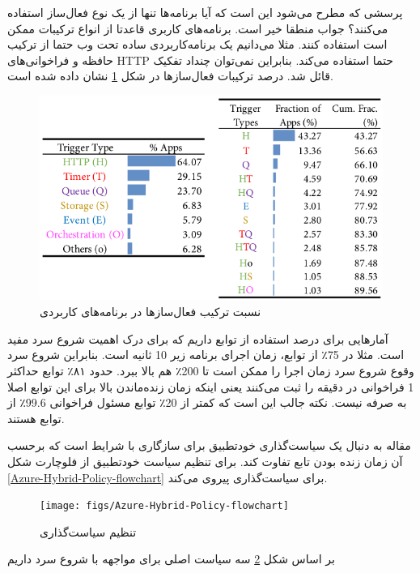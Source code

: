 پرسشی که مطرح می‌شود این است که آیا برنامه‌ها تنها از یک نوع فعال‌ساز استفاده می‌کنند؟ جواب منطقا خیر است. برنامه‌های کاربری قاعدتا از انواع ترکیبات ممکن است استفاده کنند. مثلا می‌دانیم یک برنامه‌کاربردی ساده تحت وب حتما از ترکیب حافظه و فراخوانی‌های HTTP حتما استفاده می‌کند. بنابراین نمی‌توان چنداد تفکیک قائل شد. درصد ترکیبات فعال‌ساز‌ها در شکل \ref{fig:Azure-function-compositions-applications} نشان داده شده است. 

\begin{figure}
	\centering
	\includegraphics[width=0.7\linewidth]{figs/Azure-function-compositions-applications}
	\caption {نسبت ترکیب فعال‌سازها در برنامه‌های کاربردی}
	\label{fig:Azure-function-compositions-applications}
\end{figure}

آمارهایی برای درصد استفاده از توابع داریم که برای درک اهمیت شروع سرد مفید است. مثلا در 75٪ از توابع، زمان اجرای برنامه زیر 10 ثانیه است. بنابراین شروع سرد وقوع شروع سرد زمان اجرا را ممکن است تا 200٪ هم بالا ببرد. حدود ۸۱٪ توابع حداکثر 1 فراخوانی در دقیقه را ثبت می‌کنند یعنی اینکه زمان زنده‌ماندن بالا برای این توابع اصلا به صرفه نیست. نکته جالب این است که کمتر از 20٪ توابع مسئول فراخوانی 99.6٪ از توابع هستند. 

مقاله به دنبال یک سیاست‌گذاری خودتطبیق برای سازگاری با شرایط است که برحسب آن زمان زنده بودن تابع تفاوت کند. برای تنظیم سیاست خودتطبیق از فلوچارت شکل \ref{Azure-‌Hybrid-Policy-flowchart} برای سیاست‌گذاری پیروی می‌کند. 


\begin{figure}
	\centering
	\texttt{[image: figs/Azure-‌Hybrid-Policy-flowchart]}
	\caption {تنظیم سیاست‌گذاری}
	\label{fig:Azure-‌Hybrid-Policy-flowchart}
\end{figure}

بر اساس شکل \ref{fig:Azure-‌Hybrid-Policy-flowchart} سه سیاست اصلی برای مواجهه با شروع سرد داریم

